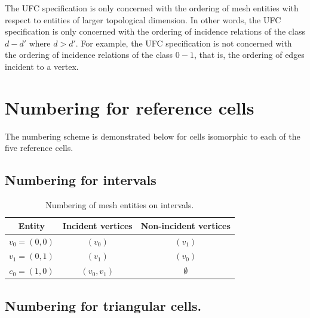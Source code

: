 The UFC specification is only concerned with the ordering of mesh
entities with respect to entities of larger topological dimension. In
other words, the UFC specification is only concerned with the ordering
of incidence relations of the class $d - d'$ where $d > d'$. For
example, the UFC specification is not concerned with the ordering of
incidence relations of the class $0 - 1$, that is, the ordering of
edges incident to a vertex.

\newpage
\section{Numbering for reference cells}

The numbering scheme is demonstrated below for cells
isomorphic to each of the five reference cells.

\subsection{Numbering for intervals}

\begin{table}[H]
\linespread{1.2}\selectfont
  \begin{center}
    \begin{tabular}{|c|c|c|}
      \hline
      Entity & Incident vertices & Non-incident vertices \\
      \hline
      \hline
      $v_0 = (0, 0)$ & $(v_0)$ & $(v_1)$ \\
      \hline
      $v_1 = (0, 1)$ & $(v_1)$ & $(v_0)$ \\
      \hline
      $c_0 = (1, 0)$ & $(v_0, v_1)$ & $\emptyset$ \\
      \hline
    \end{tabular}
    \caption{Numbering of mesh entities on intervals.}
    \label{tab:interval,entities}
  \end{center}
\end{table}

\subsection{Numbering for triangular cells.}


